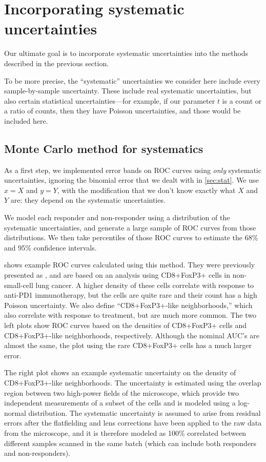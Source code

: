 \documentclass[11pt]{article}
\newcommand{\AUC}{AUC}
\begin{document}
\section{Incorporating systematic uncertainties}

Our ultimate goal is to incorporate systematic uncertainties into the methods described in the previous section.

To be more precise, the ``systematic'' uncertainties we consider here include every sample-by-sample uncertainty.  These include real systematic uncertainties, but also certain statistical uncertainties---for example, if our parameter \(t\) is a count or a ratio of counts, then they have Poisson uncertainties, and those would be included here.

\subsection{Monte Carlo method for systematics}

As a first step, we implemented error bands on ROC curves using \emph{only} systematic uncertainties, ignoring the binomial error that we dealt with in \cref{sec:stat}.  We use \(x=X\) and \(y=Y\), with the modification that we don't know exactly what \(X\) and \(Y\) are: they depend on the systematic uncertainties.

We model each responder and non-responder using a distribution of the systematic uncertainties, and generate a large sample of ROC curves from those distributions.  We then take percentiles of those ROC curves to estimate the 68\% and 95\% confidence intervals.

 shows example ROC curves calculated using this method.  They were previously presented as \autocite{SITC2023poster}, and are based on an analysis using CD8+FoxP3+ cells in non-small-cell lung cancer.  A higher density of these cells correlate with response to anti-PD1 immunotherapy, but the cells are quite rare and their count has a high Poisson uncertainty.  We also define ``CD8+FoxP3+-like neighborhoods,'' which also correlate with response to treatment, but are much more common.  The two left plots show ROC curves based on the densities of CD8+FoxP3+ cells and CD8+FoxP3+-like neighborhoods, respectively.  Although the nominal \AUC's are almost the same, the plot using the rare CD8+FoxP3+ cells has a much larger error.

The right plot shows an example systematic uncertainty on the density of CD8+FoxP3+-like neighborhoods.  The uncertainty is estimated using the overlap region between two high-power fields of the microscope, which provide two independent measurements of a subset of the cells and is modeled using a log-normal distribution.  The systematic uncertainty is assumed to arise from residual errors after the flatfielding and lens corrections have been applied to the raw data from the microscope, and it is therefore modeled as 100\% correlated between different samples scanned in the same batch (which can include both responders and non-responders).
\end{document}
